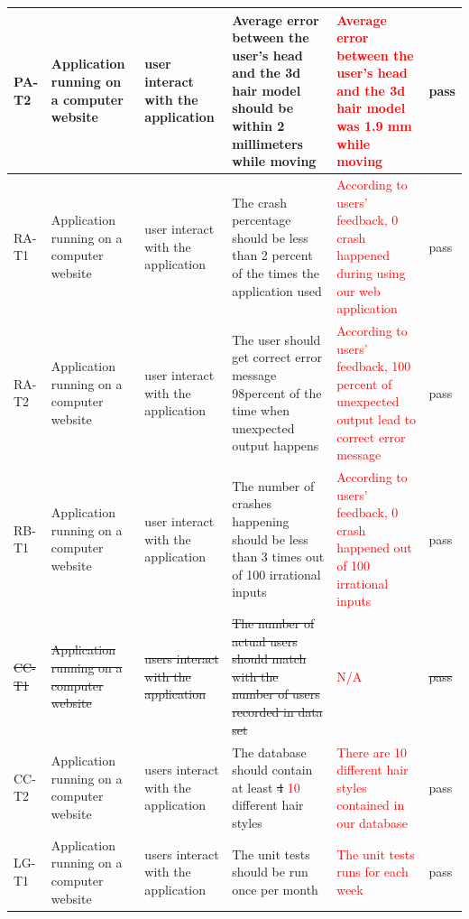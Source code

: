 \documentclass[12pt, oneside, openany, titlepage]{article}
\begin{document}
\begin{tabular}{ |p{1.5cm}| p{2cm} |p{2cm}| p{4cm}|p{3cm}|p{1.5cm}|   }

 \hline
 PA-T2 & Application running on a computer website & user interact with the application & Average error between the user's head and the 3d hair model should be within 2 millimeters while moving& \textcolor{red}{Average error between the user's head and the 3d hair model was 1.9 mm while moving} & pass\\
 \hline
 RA-T1 & Application running on a computer website & user interact with the application & The crash percentage should be less than 2 percent of the times the application used &\textcolor{red}{According to users' feedback, 0 crash happened during using our web application} & pass\\
 \hline
 RA-T2 & Application running on a computer website & user interact with the application & The user should get correct error message 98percent of the time when unexpected output happens &\textcolor{red}{According to users' feedback, 100 percent of unexpected output lead to correct error message}  & pass\\
 \hline
 RB-T1 & Application running on a computer website & user interact with the application & The number of crashes happening should be less than 3 times out of 100 irrational inputs & \textcolor{red}{According to users' feedback, 0 crash happened out of 100 irrational inputs}& pass\\
 \hline
 \sout{CC-T1} & \sout{Application running on a computer website} & \sout{users interact with the application} & \sout{The number of actual users should match with the number of users recorded in data set} &\textcolor{red}{N/A}& \sout{pass}\\
  \hline
 CC-T2 & Application running on a computer website & users interact with the application & The database should contain at least \sout{4} \textcolor{red}{10} different hair styles  &\textcolor{red}{There are 10 different hair styles contained in our database} &pass\\
  \hline
 LG-T1 & Application running on a computer website & users interact with the application & The unit tests should be run once per month&\textcolor{red}{The unit tests runs for each week}  & pass\\
 \hline
 
\end{tabular}
\end{document}
